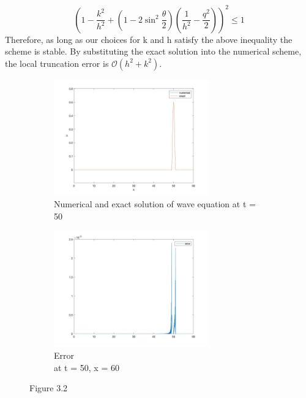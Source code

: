 \documentclass[a4paper,11pt]{article}
\begin{document}
$$\left(1-\frac{k^2}{h^2}+(1-2\sin^2 \frac{\theta}{2})\left(\frac{1}{h^2}-\frac{q^2}{2}\right)\right)^2\leqslant 1$$
Therefore, as long as our choices for k and h satisfy the above inequality the scheme is stable. 
By substituting the exact solution into the numerical scheme, the local truncation error is $\mathcal{O}(h^2+k^2)$.
\begin{figure}[H]
 \begin{subfigure}{0.5\textwidth}
 \includegraphics[width = \linewidth, height =5cm]{Q3(i).jpg}
 \caption{Numerical and exact solution of wave equation at t = 50}
 \label{Q3(a)}
 \end{subfigure}
  \begin{subfigure}{0.5\textwidth}
 \includegraphics[width = \linewidth, height =5cm]{Q3(ii).jpg}
 \caption{Error\\at t = 50, x = 60}
 \label{Q3(b)}
 \end{subfigure}
 \caption{Figure 3.2}
\end{figure}
\end{document}
